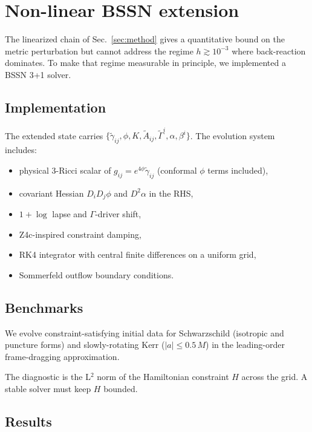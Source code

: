 \section{Non-linear BSSN extension}
\label{sec:bssn}

The linearized chain of Sec.~\ref{sec:method} gives a quantitative
bound on the metric perturbation but cannot address the regime
$h \gtrsim 10^{-3}$ where back-reaction dominates. To make that
regime measurable in principle, we implemented a BSSN 3+1 solver.

\subsection{Implementation}

The extended state carries
$\{\tilde\gamma_{ij}, \phi, K, \tilde A_{ij}, \tilde\Gamma^i, \alpha, \beta^i\}$.
The evolution system includes:

\begin{itemize}
\item physical 3-Ricci scalar of
      $g_{ij} = e^{4\phi}\tilde\gamma_{ij}$ (conformal $\phi$ terms included),
\item covariant Hessian $D_iD_j\phi$ and $D^2\alpha$ in the RHS,
\item $1{+}\log$ lapse and $\Gamma$-driver shift,
\item Z4c-inspired constraint damping,
\item RK4 integrator with central finite differences on a uniform grid,
\item Sommerfeld outflow boundary conditions.
\end{itemize}

\subsection{Benchmarks}

We evolve constraint-satisfying initial data for Schwarzschild
(isotropic and puncture forms) and slowly-rotating Kerr
($|a| \le 0.5\,M$) in the leading-order frame-dragging approximation.

The diagnostic is the L$^2$ norm of the Hamiltonian constraint $H$
across the grid. A stable solver must keep $H$ bounded.

\subsection{Results}

